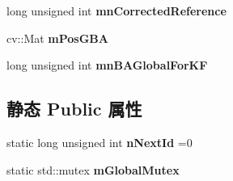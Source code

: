 \begin{DoxyCompactItemize}
\item 
\hypertarget{classORB__SLAM2_1_1MapPoint_ade5858af14ed7924d48dbf191ea5448c}{long unsigned int {\bfseries mn\-Corrected\-Reference}}\label{classORB__SLAM2_1_1MapPoint_ade5858af14ed7924d48dbf191ea5448c}

\item 
\hypertarget{classORB__SLAM2_1_1MapPoint_a2669d92452bb1347a6a09700e369f049}{cv\-::\-Mat {\bfseries m\-Pos\-G\-B\-A}}\label{classORB__SLAM2_1_1MapPoint_a2669d92452bb1347a6a09700e369f049}

\item 
\hypertarget{classORB__SLAM2_1_1MapPoint_abcef580d7b3562ea9025ea1dc2141b92}{long unsigned int {\bfseries mn\-B\-A\-Global\-For\-K\-F}}\label{classORB__SLAM2_1_1MapPoint_abcef580d7b3562ea9025ea1dc2141b92}

\end{DoxyCompactItemize}
\subsection*{静态 Public 属性}
\begin{DoxyCompactItemize}
\item 
\hypertarget{classORB__SLAM2_1_1MapPoint_aa79702928d566db4fcd7716249bd96a2}{static long unsigned int {\bfseries n\-Next\-Id} =0}\label{classORB__SLAM2_1_1MapPoint_aa79702928d566db4fcd7716249bd96a2}

\item 
\hypertarget{classORB__SLAM2_1_1MapPoint_a58d0ed9067593833efa652ea671ebf62}{static std\-::mutex {\bfseries m\-Global\-Mutex}}\label{classORB__SLAM2_1_1MapPoint_a58d0ed9067593833efa652ea671ebf62}

\end{DoxyCompactItemize}
